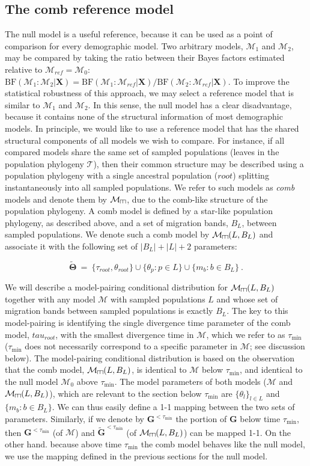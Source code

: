 \documentclass[11pt]{article}
\newcommand{\vect}[1]{\boldsymbol{\mathbf{#1}}}
\newcommand{\X}{\vect{X}}
\newcommand{\M}{\mathcal{M}}
\newcommand{\Tr}{\mathcal{T}}
\newcommand{\G}{\vect{G}}
\newcommand{\T}{\vect{\Theta}}
\newcommand{\Mref}{\M_{ref}}
\newcommand{\rbf}{\text{BF}}
\newcommand{\Gref}{\widetilde{\G}}
\newcommand{\Tref}{\widetilde{\T}}
\def\comb{\rotatebox[origin=c]{90}{$\exists$}}
\newcommand{\Mcomb}{\M_{\comb}}
\newcommand{\tmin}{\tau_{\text{min}}}
\begin{document}
\subsection*{The comb reference model}

The null model is a useful reference, because it can be used as a point of comparison for every demographic model.
%
Two arbitrary models, $\M_1$ and $\M_2$, may be compared by taking the ratio between their Bayes factors estimated relative to $\Mref=\M_0$:
$\rbf(\M_1:\M_2|\X) = \rbf(\M_1:\Mref|\X) / \rbf(\M_2:\Mref|\X)$.
%
To improve the statistical robustness of this approach, we may select a reference model that is similar to $\M_1$ and $\M_2$.
%
In this sense, the null model has a clear disadvantage, because it contains none of the structural information of most demographic models.
%
In principle, we would like to use a reference model that has the shared structural components of all models we wish to compare.
%
For instance, if all compared models share the same set of sampled populations (leaves in the population phylogeny $\Tr$),
then their common structure may be described using a population phylogeny with a single ancestral population ($root$) splitting instantaneously
into all sampled populations.
%
We refer to such models as {\em comb} models and denote them by $\Mcomb$,  due to the comb-like structure of the population phylogeny.
%
A comb model is defined by a star-like population phylogeny, as described above, and a set of  migration bands, $B_L$,
between sampled populations.
%
We denote such a comb model by $\Mcomb(L,B_L)$ and associate it with the following set of $|B_L|+|L|+2$ parameters:
%
%
\begin{small}
\begin{equation*}
 \Tref ~=~ \{ \tau_{root},\theta_{root} \} \cup \{\theta_p:p\in L\}\cup \{m_b:b\in B_L\} ~.
\end{equation*}
\end{small}
%
%

We will describe a model-pairing conditional distribution for $\Mcomb(L,B_L)$ together with any model $\M$ with sampled populations
$L$ and whose set of migration bands between sampled populations is exactly $B_L$.
%
The key to this model-pairing is identifying the single divergence time parameter of the comb model, $tau_{root}$, with the
smallest divergence time in $\M$, which we refer to as $\tmin$ ($\tmin$ does not necessarily correspond to a specific parameter in $\M$; see discussion below).
%
The model-pairing conditional distribution is based on the observation that the comb model, $\Mcomb(L,B_L)$, is identical to $\M$ below $\tmin$, and identical
to the null model $\M_0$ above $\tmin$.
%
The model parameters of both models ($\M$ and $\Mcomb(L,B_L)$), which are relevant to the section below $\tmin$ are $\{\theta_l\}_{l\in L}$ and $\{m_b:b\in B_L\}$.
%
We can thus easily define a 1-1 mapping between the two sets of parameters.
%
Similarly, if we denote by $\G^{<\tmin}$ the portion of $\G$ below time $\tmin$, then $\G^{<\tmin}$ (of $\M$) and $\Gref^{<\tmin}$ (of $\Mcomb(L,B_L)$)
can be mapped 1-1.
%
On the other hand. because above time $\tmin$ the comb model behaves like the null model, we use the mapping defined in the previous sections for the null model.
\end{document}

